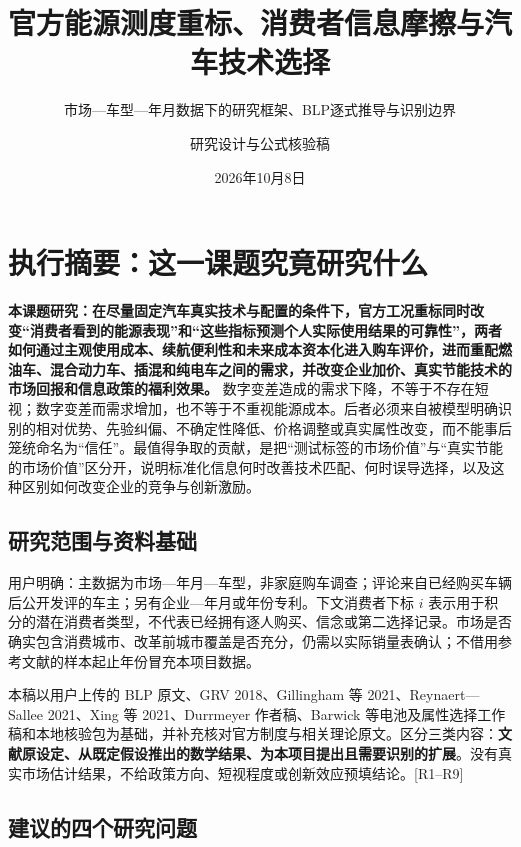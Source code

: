 \documentclass[
  11pt,
]{article}
\title{官方能源测度重标、消费者信息摩擦与汽车技术选择}
\subtitle{市场---车型---年月数据下的研究框架、BLP逐式推导与识别边界}
\author{研究设计与公式核验稿}
\date{2026年10月8日}
\begin{document}
\maketitle

{
\setcounter{tocdepth}{2}
\tableofcontents
}
\section{执行摘要：这一课题究竟研究什么}\label{ux6267ux884cux6458ux8981ux8fd9ux4e00ux8bfeux9898ux7a76ux7adfux7814ux7a76ux4ec0ux4e48}

\textbf{本课题研究：在尽量固定汽车真实技术与配置的条件下，官方工况重标同时改变``消费者看到的能源表现''和``这些指标预测个人实际使用结果的可靠性''，两者如何通过主观使用成本、续航便利性和未来成本资本化进入购车评价，进而重配燃油车、混合动力车、插混和纯电车之间的需求，并改变企业加价、真实节能技术的市场回报和信息政策的福利效果。}
数字变差造成的需求下降，不等于不存在短视；数字变差而需求增加，也不等于不重视能源成本。后者必须来自被模型明确识别的相对优势、先验纠偏、不确定性降低、价格调整或真实属性改变，而不能事后笼统命名为``信任''。最值得争取的贡献，是把``测试标签的市场价值''与``真实节能的市场价值''区分开，说明标准化信息何时改善技术匹配、何时误导选择，以及这种区别如何改变企业的竞争与创新激励。

\subsection{研究范围与资料基础}\label{ux7814ux7a76ux8303ux56f4ux4e0eux8d44ux6599ux57faux7840}

用户明确：主数据为市场---年月---车型，非家庭购车调查；评论来自已经购买车辆后公开发评的车主；另有企业---年月或年份专利。下文消费者下标
\(i\)
表示用于积分的潜在消费者类型，不代表已经拥有逐人购买、信念或第二选择记录。市场是否确实包含消费城市、改革前城市覆盖是否充分，仍需以实际销量表确认；不借用参考文献的样本起止年份冒充本项目数据。

本稿以用户上传的 BLP 原文、GRV 2018、Gillingham 等
2021、Reynaert---Sallee 2021、Xing 等 2021、Durrmeyer 作者稿、Barwick
等电池及属性选择工作稿和本地核验包为基础，并补充核对官方制度与相关理论原文。区分三类内容：\textbf{文献原设定、从既定假设推出的数学结果、为本项目提出且需要识别的扩展}。没有真实市场估计结果，不给政策方向、短视程度或创新效应预填结论。{[}R1--R9{]}

\subsection{建议的四个研究问题}\label{ux5efaux8baeux7684ux56dbux4e2aux7814ux7a76ux95eeux9898}
\end{document}
